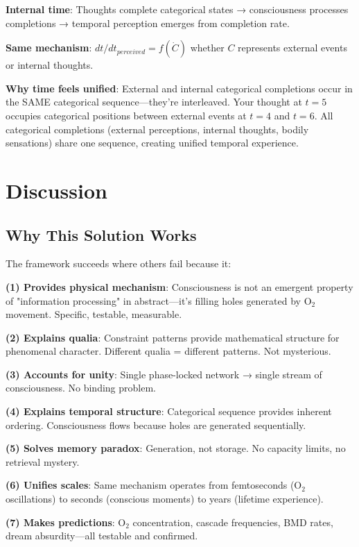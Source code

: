 \documentclass[11pt,a4paper]{article}
\begin{document}
\textbf{Internal time}: Thoughts complete categorical states → consciousness processes completions → temporal perception emerges from completion rate.

\textbf{Same mechanism}: $dt/dt_{perceived} = f(\dot{C})$ whether $C$ represents external events or internal thoughts.

\textbf{Why time feels unified}: External and internal categorical completions occur in the SAME categorical sequence—they're interleaved. Your thought at $t=5$ occupies categorical positions between external events at $t=4$ and $t=6$. All categorical completions (external perceptions, internal thoughts, bodily sensations) share one sequence, creating unified temporal experience.

\section{Discussion}

\subsection{Why This Solution Works}

The framework succeeds where others fail because it:

\textbf{(1) Provides physical mechanism}: Consciousness is not an emergent property of "information processing" in abstract—it's filling holes generated by O$_2$ movement. Specific, testable, measurable.

\textbf{(2) Explains qualia}: Constraint patterns provide mathematical structure for phenomenal character. Different qualia = different patterns. Not mysterious.

\textbf{(3) Accounts for unity}: Single phase-locked network → single stream of consciousness. No binding problem.

\textbf{(4) Explains temporal structure}: Categorical sequence provides inherent ordering. Consciousness flows because holes are generated sequentially.

\textbf{(5) Solves memory paradox}: Generation, not storage. No capacity limits, no retrieval mystery.

\textbf{(6) Unifies scales}: Same mechanism operates from femtoseconds (O$_2$ oscillations) to seconds (conscious moments) to years (lifetime experience).

\textbf{(7) Makes predictions}: O$_2$ concentration, cascade frequencies, BMD rates, dream absurdity—all testable and confirmed.
\end{document}
